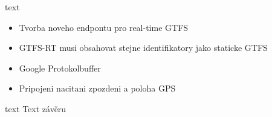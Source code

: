 text

\begin{itemize}
	\item Tvorba noveho endpontu pro real-time GTFS
	\item GTFS-RT musi obsahovat stejne identifikatory jako staticke GTFS
	\item Google Protokolbuffer
	\item Pripojeni nacitani zpozdeni a poloha GPS
\end{itemize}

text
Text závěru


